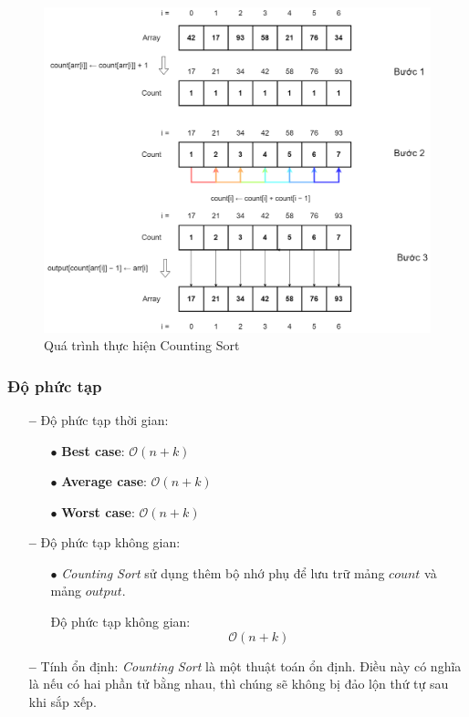 \begin{figure}[H]
    \centering
    \includegraphics[width=0.75\linewidth]{img/counting_sort/1.png}
    \caption{Quá trình thực hiện Counting Sort}
\end{figure}

\subsubsection{Độ phức tạp}

\begin{itemize}
    \item[\textbf{--}] Độ phức tạp thời gian:
    \begin{itemize}
        \item[$\bullet$] \textbf{Best case}: $\mathcal{O}(n + k)$
        \item[$\bullet$] \textbf{Average case}: $\mathcal{O}(n + k)$
        \item[$\bullet$] \textbf{Worst case}: $\mathcal{O}(n + k)$
    \end{itemize}
    \item[\textbf{--}] Độ phức tạp không gian:
    \begin{itemize}
        \item[$\bullet$] \textit{Counting Sort} sử dụng thêm bộ nhớ phụ để lưu trữ mảng $count$ và mảng $output$.
        \item[] Độ phức tạp không gian:
        \[
        \mathcal{O}(n + k)
        \]
    \end{itemize}
    \item[\textbf{--}] Tính ổn định: \textit{Counting Sort} là một thuật toán ổn định. Điều này có nghĩa là nếu có hai phần tử bằng nhau, thì chúng sẽ không bị đảo lộn thứ tự sau khi sắp xếp.
\end{itemize}
